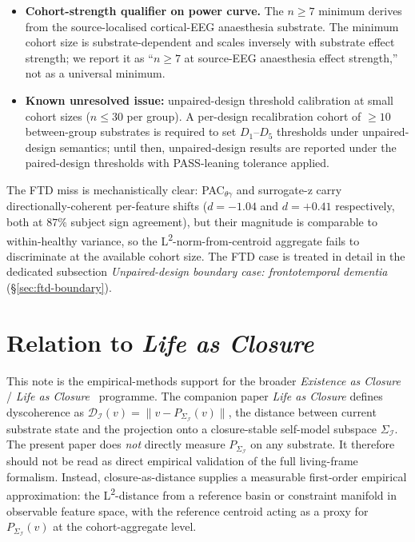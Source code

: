 \documentclass[11pt,a4paper]{article}
\begin{document}
\begin{itemize}
\item \textbf{Cohort-strength qualifier on power curve.} The $n \geq 7$ minimum derives from the source-localised cortical-EEG anaesthesia substrate. The minimum cohort size is substrate-dependent and scales inversely with substrate effect strength; we report it as ``$n \geq 7$ at source-EEG anaesthesia effect strength,'' not as a universal minimum.
\item \textbf{Known unresolved issue:} unpaired-design threshold calibration at small cohort sizes ($n \leq 30$ per group). A per-design recalibration cohort of $\geq 10$ between-group substrates is required to set $D_1$--$D_5$ thresholds under unpaired-design semantics; until then, unpaired-design results are reported under the paired-design thresholds with PASS-leaning tolerance applied.
\end{itemize}
The FTD miss is mechanistically clear: PAC$_{\theta\gamma}$ and surrogate-z carry directionally-coherent per-feature shifts ($d = -1.04$ and $d = +0.41$ respectively, both at $87\%$ subject sign agreement), but their magnitude is comparable to within-healthy variance, so the L\textsuperscript{2}-norm-from-centroid aggregate fails to discriminate at the available cohort size. The FTD case is treated in detail in the dedicated subsection \emph{Unpaired-design boundary case: frontotemporal dementia} (§\ref{sec:ftd-boundary}).

\section{Relation to \emph{Life as Closure}}\label{sec:relation-life}

This note is the empirical-methods support for the broader \emph{Existence as Closure}~\citep{SmartExistenceClosure} / \emph{Life as Closure}~\citep{SmartLifeAsClosure} programme. The companion paper \emph{Life as Closure} defines dyscoherence as $\mathcal{D}_\mathcal{I}(v) = \|v - P_{\Sigma_\mathcal{I}}(v)\|$, the distance between current substrate state and the projection onto a closure-stable self-model subspace $\Sigma_\mathcal{I}$. The present paper does \emph{not} directly measure $P_{\Sigma_\mathcal{I}}$ on any substrate. It therefore should not be read as direct empirical validation of the full living-frame formalism. Instead, closure-as-distance supplies a measurable first-order empirical approximation: the L\textsuperscript{2}-distance from a reference basin or constraint manifold in observable feature space, with the reference centroid acting as a proxy for $P_{\Sigma_\mathcal{I}}(v)$ at the cohort-aggregate level.
\end{document}
